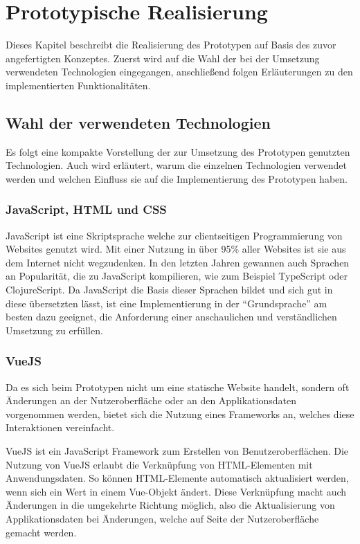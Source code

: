 \documentclass[a4paper, 12pt]{scrreprt}
\begin{document}
\chapter{Prototypische Realisierung}

Dieses Kapitel beschreibt die Realisierung des Prototypen auf Basis des zuvor angefertigten Konzeptes. Zuerst wird auf die Wahl der bei der Umsetzung verwendeten Technologien eingegangen, anschließend folgen Erläuterungen zu den implementierten Funktionalitäten.

\section{Wahl der verwendeten Technologien}
\label{sec:Technologien}
Es folgt eine kompakte Vorstellung der zur Umsetzung des Prototypen genutzten Technologien. Auch wird erläutert, warum die einzelnen Technologien verwendet werden und welchen Einfluss sie auf die Implementierung des Prototypen haben.

\subsection{JavaScript, HTML und CSS}
JavaScript ist eine Skriptsprache welche zur clientseitigen Programmierung von Websites genutzt wird. Mit einer Nutzung in über 95\% \autocite{OnlineJavascriptDistr} aller Websites ist sie aus dem Internet nicht wegzudenken. In den letzten Jahren gewannen auch Sprachen an Popularität, die zu JavaScript kompilieren, wie zum Beispiel TypeScript oder ClojureScript. Da JavaScript die Basis dieser Sprachen bildet und sich gut in diese übersetzten lässt, ist eine Implementierung in der \enquote{Grundsprache} am besten dazu geeignet, die Anforderung einer anschaulichen und verständlichen Umsetzung zu erfüllen.
\subsection{VueJS}
\label{sec:vue}
Da es sich beim Prototypen nicht um eine statische Website handelt, sondern oft Änderungen an der Nutzeroberfläche oder an den Applikationsdaten vorgenommen werden, bietet sich die Nutzung eines Frameworks an, welches diese Interaktionen vereinfacht. 

VueJS ist ein JavaScript Framework zum Erstellen von Benutzeroberflächen. Die Nutzung von VueJS erlaubt die Verknüpfung von HTML-Elementen mit Anwendungsdaten. So können HTML-Elemente automatisch aktualisiert werden, wenn sich ein Wert in einem Vue-Objekt ändert. Diese Verknüpfung macht auch Änderungen in die umgekehrte Richtung möglich, also die Aktualisierung von Applikationsdaten bei Änderungen, welche auf Seite der Nutzeroberfläche gemacht werden.
\end{document}
